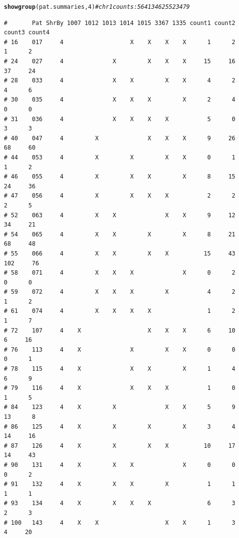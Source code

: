 \documentclass{article}\usepackage[]{graphicx}\usepackage[]{color}
\makeatletter
\newcommand{\hlnum}[1]{\textcolor[rgb]{0.686,0.059,0.569}{#1}}%
\newcommand{\hlcom}[1]{\textcolor[rgb]{0.678,0.584,0.686}{\textit{#1}}}%
\newcommand{\hlstd}[1]{\textcolor[rgb]{0.345,0.345,0.345}{#1}}%
\newcommand{\hlkwd}[1]{\textcolor[rgb]{0.737,0.353,0.396}{\textbf{#1}}}%
\newenvironment{kframe}{%
 \def\at@end@of@kframe{}%
 \ifinner\ifhmode%
  \def\at@end@of@kframe{\end{minipage}}%
  \begin{minipage}{\columnwidth}%
 \fi\fi%
 \def\FrameCommand##1{\hskip\@totalleftmargin \hskip-\fboxsep
 \colorbox{shadecolor}{##1}\hskip-\fboxsep
     \hskip-\linewidth \hskip-\@totalleftmargin \hskip\columnwidth}%
 \MakeFramed {\advance\hsize-\width
   \@totalleftmargin\z@ \linewidth\hsize
   \@setminipage}}%
 {\par\unskip\endMakeFramed%
 \at@end@of@kframe}
\newenvironment{knitrout}{}{} %
\makeatother
\begin{document}
\begin{knitrout}\footnotesize
{}\color{fgcolor}\begin{kframe}
\begin{alltt}
\hlkwd{showgroup}\hlstd{(pat.summaries,}\hlnum{4}\hlstd{)} \hlcom{# chr 1 counts: 564   1346   2552  3479}
\end{alltt}
\begin{verbatim}
#       Pat ShrBy 1007 1012 1013 1014 1015 3367 1335 count1 count2 count3 count4
# 16    017     4                   X    X    X    X      1      2      1      2
# 24    027     4              X         X    X    X     15     16     37     24
# 28    033     4              X    X         X    X      4      2      4      6
# 30    035     4              X    X    X         X      2      4      0      0
# 31    036     4              X    X    X    X           5      0      3      3
# 40    047     4         X              X    X    X      9     26     68     60
# 44    053     4         X         X         X    X      0      1      1      2
# 46    055     4         X         X    X         X      8     15     24     36
# 47    056     4         X         X    X    X           2      2      2      5
# 52    063     4         X    X              X    X      9     12     34     21
# 54    065     4         X    X         X         X      8     21     68     48
# 55    066     4         X    X         X    X          15     43    102     76
# 58    071     4         X    X    X              X      0      2      0      0
# 59    072     4         X    X    X         X           4      2      1      2
# 61    074     4         X    X    X    X                1      2      1      7
# 72    107     4    X                   X    X    X      6     10      6     16
# 76    113     4    X              X         X    X      0      0      0      1
# 78    115     4    X              X    X         X      1      4      6      9
# 79    116     4    X              X    X    X           1      0      1      5
# 84    123     4    X         X              X    X      5      9     13      8
# 86    125     4    X         X         X         X      3      4     14     16
# 87    126     4    X         X         X    X          10     17     14     43
# 90    131     4    X         X    X              X      0      0      0      2
# 91    132     4    X         X    X         X           1      1      1      1
# 93    134     4    X         X    X    X                6      3      2      3
# 100   143     4    X    X                   X    X      1      3      4     20

\end{verbatim}
\end{kframe}
\end{knitrout}
\end{document}
